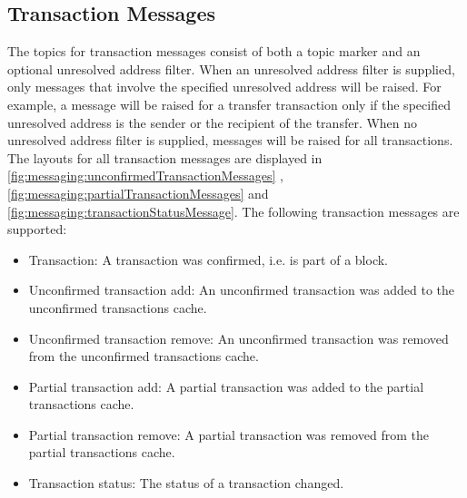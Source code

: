 \subsection{Transaction Messages}

The topics for transaction messages consist of both a topic marker and an optional unresolved address filter.
When an unresolved address filter is supplied, only messages that involve the specified unresolved address will be raised.
For example, a message will be raised for a transfer transaction only if the specified unresolved address is the sender or the recipient of the transfer.
When no unresolved address filter is supplied, messages will be raised for all transactions.
The layouts for all transaction messages are displayed in \autoref{fig:messaging:unconfirmedTransactionMessages} , \autoref{fig:messaging:partialTransactionMessages} and \autoref{fig:messaging:transactionStatusMessage}.
The following transaction messages are supported:

\begin{itemize}
	\item{Transaction: A transaction was confirmed, i.e. is part of a block.}
	\item{Unconfirmed transaction add: An unconfirmed transaction was added to the unconfirmed transactions cache.}
	\item{Unconfirmed transaction remove: An unconfirmed transaction was removed from the unconfirmed transactions cache.}
	\item{Partial transaction add: A partial transaction was added to the partial transactions cache.}
	\item{Partial transaction remove: A partial transaction was removed from the partial transactions cache.}
	\item{Transaction status: The status of a transaction changed.}
\end{itemize}

\begin{figure}[H]
	\label{fig:messaging:unconfirmedTransactionMessages}
\end{figure}

